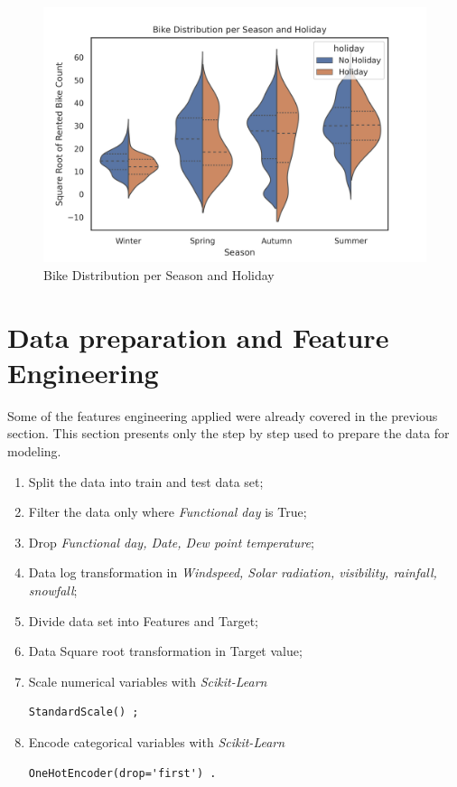 \documentclass[11pt, a4]{article}
\begin{document}
\begin{figure}[!h]
\includegraphics[]{violin}
\centering
\caption{Bike Distribution per Season and Holiday}
\label{fig:violin}
\end{figure}

\section*{Data preparation and Feature Engineering}

Some of the features engineering applied were already covered in the previous section. This section presents only the step by step used to prepare the data for modeling.

\begin{enumerate}
\item Split the data into train and test data set;
\item Filter the data only where \textit{Functional day} is True;
\item Drop \textit{Functional day, Date, Dew point temperature};
\item Data log transformation in \textit{Windspeed, Solar radiation, visibility, rainfall, snowfall};
\item Divide data set into Features and Target;
\item Data Square root transformation in Target value;
\item Scale numerical variables with \textit{Scikit-Learn}
\begin{lstlisting} 
StandardScale() ;
\end{lstlisting}
\item Encode categorical variables with \textit{Scikit-Learn}
\begin{lstlisting} 
OneHotEncoder(drop='first') .
\end{lstlisting}
\end{enumerate}
\end{document}
